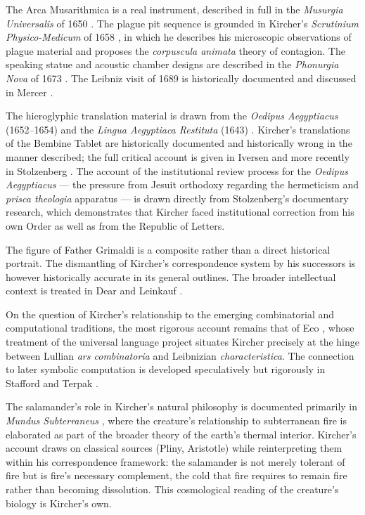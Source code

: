 \documentclass[12pt, a4paper, twoside]{memoir}
\theoremstyle{definition}
\theoremstyle{remark}
\begin{document}
The Arca Musarithmica is a real instrument, described in full in the \textit{Musurgia Universalis} of 1650 \cite{kircher1650}. The plague pit sequence is grounded in Kircher's \textit{Scrutinium Physico-Medicum} of 1658 \cite{kircher1658}, in which he describes his microscopic observations of plague material and proposes the \textit{corpuscula animata} theory of contagion. The speaking statue and acoustic chamber designs are described in the \textit{Phonurgia Nova} of 1673 \cite{kircher1673}. The Leibniz visit of 1689 is historically documented and discussed in Mercer \cite{mercer2001}.

The hieroglyphic translation material is drawn from the \textit{Oedipus Aegyptiacus} (1652--1654) \cite{kircher1652} and the \textit{Lingua Aegyptiaca Restituta} (1643) \cite{kircher1643}. Kircher's translations of the Bembine Tablet are historically documented and historically wrong in the manner described; the full critical account is given in Iversen \cite{iversen1961} and more recently in Stolzenberg \cite{stolzenberg2004}. The account of the institutional review process for the \textit{Oedipus Aegyptiacus} --- the pressure from Jesuit orthodoxy regarding the hermeticism and \textit{prisca theologia} apparatus --- is drawn directly from Stolzenberg's documentary research, which demonstrates that Kircher faced institutional correction from his own Order as well as from the Republic of Letters.

The figure of Father Grimaldi is a composite rather than a direct historical portrait. The dismantling of Kircher's correspondence system by his successors is however historically accurate in its general outlines. The broader intellectual context is treated in Dear \cite{dear2001} and Leinkauf \cite{leinkauf1993}.

On the question of Kircher's relationship to the emerging combinatorial and computational traditions, the most rigorous account remains that of Eco \cite{eco1995}, whose treatment of the universal language project situates Kircher precisely at the hinge between Lullian \textit{ars combinatoria} and Leibnizian \textit{characteristica}. The connection to later symbolic computation is developed speculatively but rigorously in Stafford and Terpak \cite{stafford2001}.

The salamander's role in Kircher's natural philosophy is documented primarily in \textit{Mundus Subterraneus} \cite{kircher1665}, where the creature's relationship to subterranean fire is elaborated as part of the broader theory of the earth's thermal interior. Kircher's account draws on classical sources (Pliny, Aristotle) while reinterpreting them within his correspondence framework: the salamander is not merely tolerant of fire but is fire's necessary complement, the cold that fire requires to remain fire rather than becoming dissolution. This cosmological reading of the creature's biology is Kircher's own.
\end{document}
